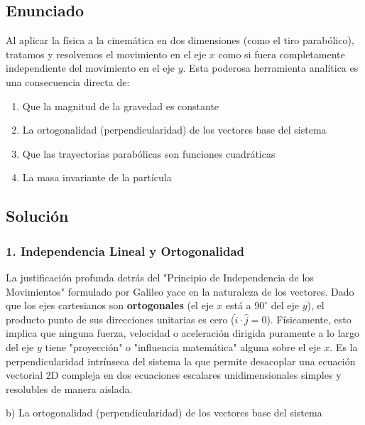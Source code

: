 \documentclass[12pt, a4paper]{article}
\begin{document}
\subsection*{Enunciado}
Al aplicar la física a la cinemática en dos dimensiones (como el tiro parabólico), tratamos y resolvemos el movimiento en el eje $x$ como si fuera completamente independiente del movimiento en el eje $y$. Esta poderosa herramienta analítica es una consecuencia directa de:
\begin{enumerate}[label=\alph*)]
    \item Que la magnitud de la gravedad es constante
    \item La ortogonalidad (perpendicularidad) de los vectores base del sistema
    \item Que las trayectorias parabólicas son funciones cuadráticas
    \item La masa invariante de la partícula
\end{enumerate}

\subsection*{Solución}

\subsubsection*{1. Independencia Lineal y Ortogonalidad}
La justificación profunda detrás del "Principio de Independencia de los Movimientos" formulado por Galileo yace en la naturaleza de los vectores.
Dado que los ejes cartesianos son \textbf{ortogonales} (el eje $x$ está a $90^\circ$ del eje $y$), el producto punto de sus direcciones unitarias es cero ($\hat{i} \cdot \hat{j} = 0$). 
Físicamente, esto implica que ninguna fuerza, velocidad o aceleración dirigida puramente a lo largo del eje $y$ tiene "proyección" o "influencia matemática" alguna sobre el eje $x$. Es la perpendicularidad intrínseca del sistema la que permite desacoplar una ecuación vectorial 2D compleja en dos ecuaciones escalares unidimensionales simples y resolubles de manera aislada.

\begin{tcolorbox}[colback=green!5!white, colframe=green!50!black, title=Respuesta Final]
\centering \Large b) La ortogonalidad (perpendicularidad) de los vectores base del sistema
\end{tcolorbox}
\end{document}
